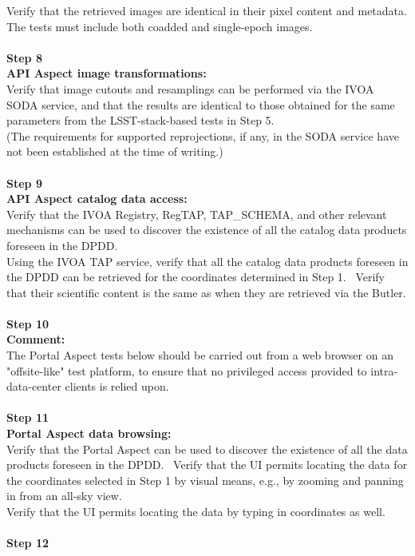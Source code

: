 Verify that the retrieved images are identical in their pixel content
and metadata.\\
The tests must include both coadded and single-epoch images.\\
~\\
\textbf{Step 8}\\
\textbf{API Aspect image transformations:}\\
Verify that image cutouts and resamplings can be performed via the IVOA
SODA service, and that the results are identical to those obtained for
the same parameters from the LSST-stack-based tests in Step 5.\\
(The requirements for supported reprojections, if any, in the SODA
service have not been established at the time of writing.)\\
~\\
\textbf{Step 9}\\
\textbf{API Aspect catalog data access:}\\
Verify that the IVOA Registry, RegTAP, TAP\_SCHEMA, and other relevant
mechanisms can be used to discover the existence of all the catalog data
products foreseen in the DPDD.\\
Using the IVOA TAP service, verify that all the catalog data products
foreseen in the DPDD can be retrieved for the coordinates determined in
Step 1. ~Verify that their scientific content is the same as when they
are retrieved via the Butler.\\
~\\
\textbf{Step 10}\\
\textbf{Comment:}\\
The Portal Aspect tests below should be carried out from a web browser
on an "offsite-like" test platform, to ensure that no privileged access
provided to intra-data-center clients is relied upon.\\
~\\
\textbf{Step 11}\\
\textbf{Portal Aspect data browsing:}\\
Verify that the Portal Aspect can be used to discover the existence of
all the data products foreseen in the DPDD. ~Verify that the UI permits
locating the data for the coordinates selected in Step 1 by visual
means, e.g., by zooming and panning in from an all-sky view.\\
Verify that the UI permits locating the data by typing in coordinates as
well.\\
~\\
\textbf{Step 12}\\
